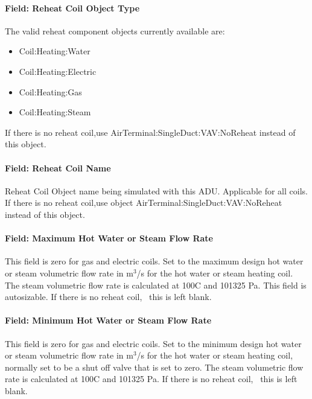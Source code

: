 \paragraph{Field: Reheat Coil Object Type}\label{field-reheat-coil-object-type-1}

The valid reheat component objects currently available are:

\begin{itemize}
\item
  Coil:Heating:Water
\item
  Coil:Heating:Electric
\item
  Coil:Heating:Gas
\item
  Coil:Heating:Steam
\end{itemize}

If there is no reheat coil,use AirTerminal:SingleDuct:VAV:NoReheat instead of this object.

\paragraph{Field: Reheat Coil Name}\label{field-reheat-coil-name-1}

Reheat Coil Object name being simulated with this ADU. Applicable for all coils. If there is no reheat coil,use object AirTerminal:SingleDuct:VAV:NoReheat instead of this object.

\paragraph{Field: Maximum Hot Water or Steam Flow Rate}\label{field-maximum-hot-water-or-steam-flow-rate-1}

This field is zero for gas and electric coils. Set to the maximum design hot water or steam volumetric flow rate in m\(^{3}\)/s for the hot water or steam heating coil. The steam volumetric flow rate is calculated at 100C and 101325 Pa. This field is autosizable. If there is no reheat coil,~ this is left blank.

\paragraph{Field: Minimum Hot Water or Steam Flow Rate}\label{field-minimum-hot-water-or-steam-flow-rate-1}

This field is zero for gas and electric coils. Set to the minimum design hot water or steam volumetric flow rate in m\(^{3}\)/s for the hot water or steam heating coil, normally set to be a shut off valve that is set to zero. The steam volumetric flow rate is calculated at 100C and 101325 Pa. If there is no reheat coil,~ this is left blank.

